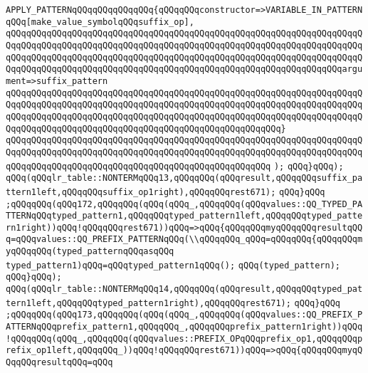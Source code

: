 \verb|APPLY_PATTERNqQQqqQQqqQQqqQQq{qQQqqQQqconstructor=>VARIABLE_IN_PATTERNqQQq[make_value_symbolqQQqsuffix_op],|\newline
\verb|qQQqqQQqqQQqqQQqqQQqqQQqqQQqqQQqqQQqqQQqqQQqqQQqqQQqqQQqqQQqqQQqqQQqqQQqqQQqqQQqqQQqqQQqqQQqqQQqqQQqqQQqqQQqqQQqqQQqqQQqqQQqqQQqqQQqqQQqqQQqqQQqqQQqqQQqqQQqqQQqqQQqqQQqqQQqqQQqqQQqqQQqqQQqqQQqqQQqqQQqqQQqqQQqqQQqqQQqqQQqqQQqqQQqqQQqqQQqqQQqqQQqqQQqqQQqqQQqqQQqqQQqqQQqqQQqqQQqargument=>suffix_pattern|\newline
\verb|qQQqqQQqqQQqqQQqqQQqqQQqqQQqqQQqqQQqqQQqqQQqqQQqqQQqqQQqqQQqqQQqqQQqqQQqqQQqqQQqqQQqqQQqqQQqqQQqqQQqqQQqqQQqqQQqqQQqqQQqqQQqqQQqqQQqqQQqqQQqqQQqqQQqqQQqqQQqqQQqqQQqqQQqqQQqqQQqqQQqqQQqqQQqqQQqqQQqqQQqqQQqqQQqqQQqqQQqqQQqqQQqqQQqqQQqqQQqqQQqqQQqqQQqqQQqqQQqqQQqqQQq}|\newline
\verb|qQQqqQQqqQQqqQQqqQQqqQQqqQQqqQQqqQQqqQQqqQQqqQQqqQQqqQQqqQQqqQQqqQQqqQQqqQQqqQQqqQQqqQQqqQQqqQQqqQQqqQQqqQQqqQQqqQQqqQQqqQQqqQQqqQQqqQQqqQQqqQQqqQQqqQQqqQQqqQQqqQQqqQQqqQQqqQQqqQQqqQQqqQQqqQQq|\newline
\verb|);|\newline
\verb|qQQq}qQQq);|\newline
\verb|qQQq(qQQqlr_table::NONTERMqQQq13,qQQqqQQq(qQQqresult,qQQqqQQqsuffix_pattern1left,qQQqqQQqsuffix_op1right),qQQqqQQqrest671);|\newline
\verb|qQQq}qQQq|\newline
\verb|;qQQqqQQq(qQQq172,qQQqqQQq(qQQq(qQQq_,qQQqqQQq(qQQqvalues::QQ_TYPED_PATTERNqQQqtyped_pattern1,qQQqqQQqtyped_pattern1left,qQQqqQQqtyped_pattern1right))qQQq!qQQqqQQqrest671))qQQq=>qQQq{qQQqqQQqmyqQQqqQQqresultqQQq=qQQqvalues::QQ_PREFIX_PATTERNqQQq(\\qQQqqQQq_qQQq=qQQqqQQq{qQQqqQQqmyqQQqqQQq(typed_patternqQQqasqQQq|\newline
\verb|typed_pattern1)qQQq=qQQqtyped_pattern1qQQq();|\newline
\verb|qQQq(typed_pattern);|\newline
\verb|qQQq}qQQq);|\newline
\verb|qQQq(qQQqlr_table::NONTERMqQQq14,qQQqqQQq(qQQqresult,qQQqqQQqtyped_pattern1left,qQQqqQQqtyped_pattern1right),qQQqqQQqrest671);|\newline
\verb|qQQq}qQQq|\newline
\verb|;qQQqqQQq(qQQq173,qQQqqQQq(qQQq(qQQq_,qQQqqQQq(qQQqvalues::QQ_PREFIX_PATTERNqQQqprefix_pattern1,qQQqqQQq_,qQQqqQQqprefix_pattern1right))qQQq!qQQqqQQq(qQQq_,qQQqqQQq(qQQqvalues::PREFIX_OPqQQqprefix_op1,qQQqqQQqprefix_op1left,qQQqqQQq_))qQQq!qQQqqQQqrest671))qQQq=>qQQq{qQQqqQQqmyqQQqqQQqresultqQQq=qQQq|\newline
